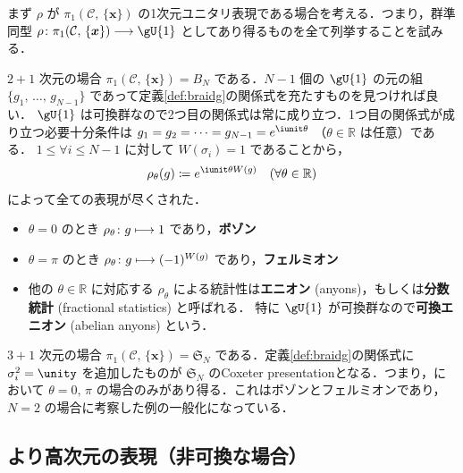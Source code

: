 \documentclass[TQFT_main]{subfiles}
\begin{document}
まず $\rho$ が $\pi_1(\mathcal{C},\, \{\bm{x}\})$ の1次元ユニタリ表現である場合を考える．つまり，群準同型 $\rho \colon \pi_1(\mathcal{C},\, \{\bm{x}\}) \lto \gU{1}$ としてあり得るものを全て列挙することを試みる．

\begin{myexample}[label=ex:1-1abelian]{$2+1$ 次元の場合}
    $\pi_1(\mathcal{C},\, \{\bm{x}\}) = B_N$ である．$N-1$ 個の $\gU{1}$ の元の組 $\{g_1,\, \dots ,\, g_{N-1}\}$ であって定義\ref{def:braidg}の関係式を充たすものを見つければ良い．
    $\gU{1}$ は可換群なので2つ目の関係式は常に成り立つ．1つ目の関係式が成り立つ必要十分条件は $g_1 = g_2 = \cdots  = g_{N-1} = e^{\iunit \theta}$ （$\theta \in \mathbb{R}$ は任意）である．
    $1 \le \forall i \le N-1$ に対して $W(\sigma_i) = 1$ であることから，
    \begin{align}
        \rho_\theta (g) \coloneqq e^{\iunit \theta W(g)}\quad (\forall \theta \in \mathbb{R})
    \end{align}
    によって全ての表現が尽くされた．
    \begin{itemize}
        \item $\theta = 0$ のとき $\rho_\theta \colon g \longmapsto 1$ であり，\textbf{ボゾン}
        \item $\theta = \pi$ のとき $\rho_\theta \colon g \longmapsto (-1)^{W(g)}$ であり，\textbf{フェルミオン}
        \item 他の $\theta \in \mathbb{R}$ に対応する $\rho_\theta$ による統計性は\textbf{エニオン} (anyons)，もしくは\textbf{分数統計} (fractional statistics) と呼ばれる．
        特に $\gU{1}$ が可換群なので\textbf{可換エニオン} (abelian anyons) という．
    \end{itemize}
\end{myexample}

\begin{myexample}[label=ex:1-2abelian]{$3+1$ 次元の場合}
    $\pi_1(\mathcal{C},\, \{\bm{x}\}) = \mathfrak{S}_N$ である．定義\ref{def:braidg}の関係式に $\sigma_i^2 = \unity$ を追加したものが $\mathfrak{S}_N$ のCoxeter presentationとなる．つまり，において $\theta = 0,\, \pi$ の場合のみがあり得る．これはボゾンとフェルミオンであり，$N=2$ の場合に考察した例の一般化になっている．
\end{myexample}

\subsection{より高次元の表現（非可換な場合）}
\end{document}
